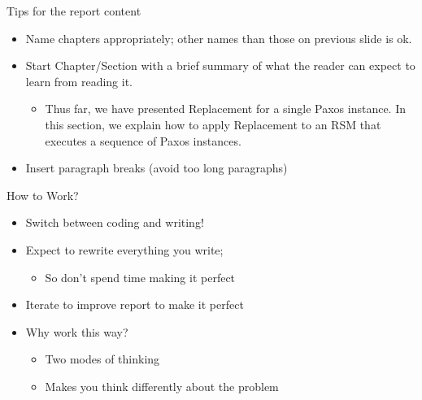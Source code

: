 \documentclass[hyperref={pdfpagelabels=false}, aspectratio=1610]{beamer}
\begin{document}


\begin{frame}
\begin{block}{Tips for the report content}
 \begin{itemize}
  \item Name chapters appropriately; other names than those on previous slide is ok.
  \item Start Chapter/Section with a brief summary of what the reader can expect to learn from reading it.
  \begin{itemize}
   \item Thus far, we have presented Replacement for a single Paxos instance. In this section, we explain how to apply Replacement to an RSM that executes a sequence of Paxos instances.
  \end{itemize}
  \item Insert paragraph breaks (avoid too long paragraphs)
 \end{itemize}
\end{block}
\end{frame}

\begin{frame}
\begin{block}{How to Work?}
 \begin{itemize}
  \item<2-> Switch between coding and writing!
  \item<3-> Expect to rewrite everything you write; 
  \begin{itemize}
  	\item<3-> So don't spend time making it perfect 
  \end{itemize}
  \item<4-> Iterate to improve report to make it perfect
  \item<5-> Why work this way?
  \begin{itemize}
	\item<6-> Two modes of thinking
  	\item<6-> Makes you think differently about the problem 
  \end{itemize}
 \end{itemize}
\end{block}
\end{frame}
\end{document}
